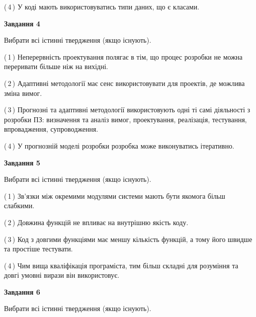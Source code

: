 \documentclass[10pt, ukrainian]{article}
\begin{document}
{\begin {large}
(\,4\,) У коді мають використовуватись типи даних, що є класами. %


{\begin {center}\textbf{Завдання 4}\end {center}}\par
Вибрати всі істинні твердження (якщо існують).\par
\vspace{2mm}



(\,1\,) Неперервність проектування полягає в тім, що процес розробки не можна переривати більше ніж на вихідні. %



(\,2\,) Адаптивні методології має сенс використовувати для проектів, де можлива зміна вимог. %



(\,3\,) Прогнозні та адаптивні методології використовують одні ті самі діяльності з розробки ПЗ: визначення та аналіз вимог, проектування, реалізація, тестування, впровадження, супроводження. %



(\,4\,) У прогнозній моделі розробки розробка може виконуватись ітеративно. %


{\begin {center}\textbf{Завдання 5}\end {center}}\par
Вибрати всі істинні твердження (якщо існують).\par
\vspace{2mm}



(\,1\,) Зв'язки між окремими модулями системи мають бути якомога більш слабкими. %



(\,2\,) Довжина функцій не впливає на внутрішню якість коду. %



(\,3\,) Код з довгими функціями має меншу кількість функцій, а тому його швидше та простіше тестувати. %



(\,4\,) Чим вища кваліфікація програміста, тим більш складні для розуміння та довгі умовні вирази він використовує. %

\newpage

{\begin {center}\textbf{Завдання 6}\end {center}}\par
Вибрати всі істинні твердження (якщо існують).\par
\vspace{2mm}




\end{large}}
\end{document}
